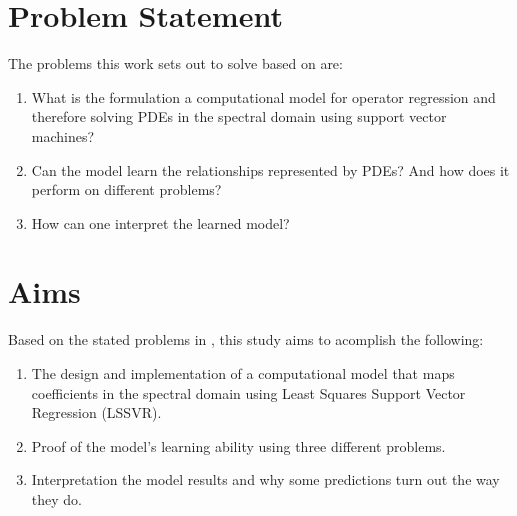 \section{Problem Statement}\label{sec:problem_statement}
\noindent The problems this work sets out to solve based on  are:
\begin{enumerate}
    \item What is the formulation a computational model for operator regression and therefore solving PDEs in the spectral domain using support vector machines?
    \item Can the model learn the relationships represented by PDEs? And how does it perform on different problems?
    \item How can one interpret the learned model?
\end{enumerate}




\section{Aims}\label{sec:aims}
\noindent Based on the stated problems in , this study aims to acomplish the following:
\begin{enumerate}
    \item The design and implementation of a computational model that maps coefficients in the spectral domain using Least Squares Support Vector Regression (LSSVR).
    \item Proof of the model's learning ability using three different problems.
    \item Interpretation the model results and why some predictions turn out the way they do.
\end{enumerate}

